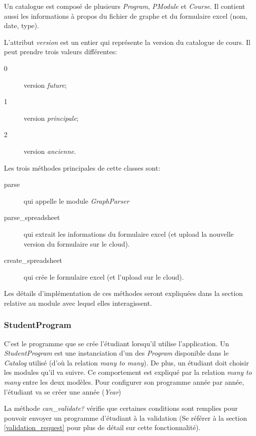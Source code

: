 Un catalogue est composé de plusieurs \textit{Program}, \textit{PModule} et \textit{Course}. Il contient aussi les informations à propos du fichier de graphe et du formulaire excel (nom, date, type). 

L'attribut \textit{version} est un entier qui représente la version du catalogue de cours. Il peut prendre trois valeurs différentes:

\begin{description}
  \item[0] version \textit{future};
  \item[1] version \textit{principale};
  \item[2] version \textit{ancienne}.
\end{description}

Les trois méthodes principales de cette classes sont:

\begin{description}
  \item[parse] qui appelle le module \textit{GraphParser}
  \item[parse\_spreadsheet] qui extrait les informations du formulaire excel (et upload la nouvelle version du formulaire sur le cloud).
  \item[create\_spreadsheet] qui crée le formulaire excel (et l'upload sur le cloud).
\end{description}

Les détails d'implémentation de ces méthodes seront expliquées dans la section relative au module avec lequel elles interagissent. 

\subsubsection{StudentProgram}

C'est le programme que se crée l'étudiant lorsqu'il utilise l'application. Un \textit{StudentProgram} est une instanciation d'un des \textit{Program} disponible dans le \textit{Catalog} utilisé (d'où la relation \textit{many to many}). De plus, un étudiant doit choisir les modules qu'il va suivre. Ce comportement est expliqué par la relation \textit{many to many} entre les deux modèles. Pour configurer son programme année par année, l'étudiant va se créer une année (\textit{Year})

La méthode \textit{can\_validate?} vérifie que certaines conditions sont remplies pour pouvoir envoyer un programme d'étudiant à la validation (Se référer à la section \ref{validation_request} pour plus de détail sur cette fonctionnalité).

